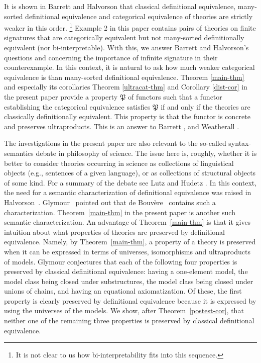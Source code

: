 \documentclass[12pt,leqno]{article}
\newcommand{\Pp}{\mbox{$\mathfrak P$}}
\begin{document}
It is shown in Barrett and Halvorson \cite{BH16} that classical definitional equivalence, many-sorted definitional equivalence and categorical equivalence of theories are strictly weak\-er in this order.%
\footnote{It is not clear to us how bi-interpretability fits into this sequence.}
%
 Example 2 in this paper contains  pairs of theories on finite signatures that are categorically equivalent but not many-sorted definitionally equivalent (nor bi-interpretable). With this, we answer Barrett and Halvorson's questions \cite[Question 6.1]{BH16} and \cite[Question 1, p.77]{BDis17} concerning the importance of infinite signature in their counterexample.  In this context, it is natural to ask how much weaker categorical equivalence is than many-sorted definitional equivalence. Theorem \ref{main-thm} and especially its corollaries Theorem \ref{ultracat-thm} and Corollary \ref{dist-cor} in the present paper provide a property $\Pp$ of functors such that a functor establishing the categorical equivalence satisfies $\Pp$ if and only if the theories are classically definitionally equivalent. This property is that the functor is concrete and preserves ultraproducts. This is an answer to Barrett \cite[the question below Corollary 2]{Bsym}, \cite[Question 2]{BDis17} and Weatherall \cite[Note 23]{Weatherall}. 
 
 The investigations in the present paper are also relevant to the so-called syntax-semantics debate in philosophy of science. The issue here is, roughly, whether it is better to consider theories occurring in science as collections of linguistical objects (e.g., sentences of a given language), or as collections of structural objects of some kind. For a summary of the debate see Lutz \cite{Lutz} and Hudetz \cite{Hudetz}.  In this context, the need for a semantic characterization of definitional equivalence was raised in Halvorson~\cite{Halwhat}. Glymour~\cite{Gly} pointed out that de Bouv\`ere~\cite{Bou} contains such a characterization. Theorem~\ref{main-thm} in the present paper is another such semantic characterization. An advantage of Theorem~\ref{main-thm} is that it gives intuition about what properties of theories are preserved by definitional equivalence. Namely, by Theorem~\ref{main-thm}, a property of a theory is preserved when it can be expressed in terms of universes, isomorphisms and ultraproducts of models. Glymour \cite[p.296]{Gly} conjectures that each of the following four properties is preserved by classical definitional equivalence: having a one-element model, the model class being closed under substructures, the model class being closed under unions of chains, and having an equational axiomatization. Of these, the first property is clearly preserved by definitional equivalence because it is expressed by using the universes of the models. We show, after Theorem~\ref{postest-cor}, that neither one of the remaining three properties is preserved by classical definitional equivalence. 
\end{document}
